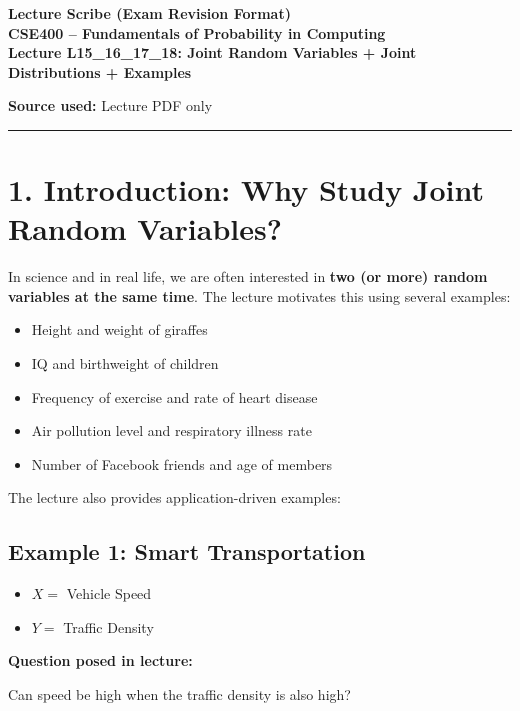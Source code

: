 \documentclass[12pt]{article}
\begin{document}
\begin{center}
    {\LARGE \textbf{Lecture Scribe (Exam Revision Format)}}\\[1em]
    {\Large \textbf{CSE400 – Fundamentals of Probability in Computing}}\\[0.5em]
    {\large \textbf{Lecture L15\_16\_17\_18: Joint Random Variables + Joint Distributions + Examples}}
\end{center}

\vspace{0.5em}

\noindent \textbf{Source used:} Lecture PDF only

\hrule
\vspace{1em}

\section*{1. Introduction: Why Study Joint Random Variables?}

In science and in real life, we are often interested in \textbf{two (or more) random variables at the same time}. The lecture motivates this using several examples:

\begin{itemize}
    \item Height and weight of giraffes
    \item IQ and birthweight of children
    \item Frequency of exercise and rate of heart disease
    \item Air pollution level and respiratory illness rate
    \item Number of Facebook friends and age of members
\end{itemize}

The lecture also provides application-driven examples:

\subsection*{Example 1: Smart Transportation}

\begin{itemize}
    \item \(X =\) Vehicle Speed
    \item \(Y =\) Traffic Density
\end{itemize}

\noindent \textbf{Question posed in lecture:}

Can speed be high when the traffic density is also high?
\end{document}
